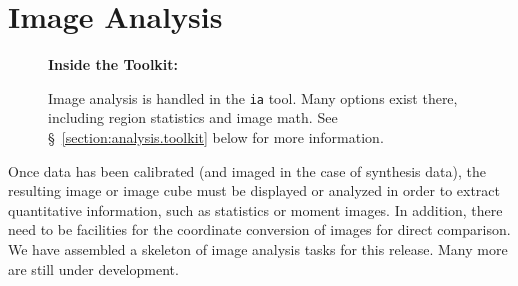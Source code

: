 

\chapter{Image Analysis}
\label{chapter:analysis}

\begin{wrapfigure}{r}{2.5in}
  \begin{boxedminipage}{2.5in}
     \centerline{\bf Inside the Toolkit:}
     Image analysis is handled in the {\tt ia} tool.
     Many options exist there, including region statistics and
     image math. See \S~\ref{section:analysis.toolkit} below
     for more information.
  \end{boxedminipage}
\end{wrapfigure}

Once data has been calibrated (and imaged in the case of synthesis
data), the resulting image or image cube must be displayed or 
analyzed in order to extract quantitative information, such as
statistics or moment images.  In addition, there need to be facilities for
the coordinate conversion of images for direct comparison.
We have assembled a skeleton of image analysis tasks for
this release.  Many more are still under development.

